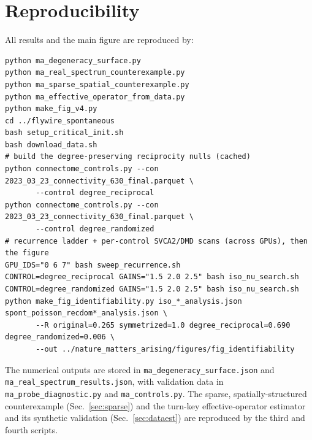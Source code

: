 \documentclass[11pt]{article}
\begin{document}
\section{Reproducibility}
All results and the main figure are reproduced by:
\begin{verbatim}
python ma_degeneracy_surface.py
python ma_real_spectrum_counterexample.py
python ma_sparse_spatial_counterexample.py
python ma_effective_operator_from_data.py
python make_fig_v4.py
cd ../flywire_spontaneous
bash setup_critical_init.sh
bash download_data.sh
# build the degree-preserving reciprocity nulls (cached)
python connectome_controls.py --con 2023_03_23_connectivity_630_final.parquet \
       --control degree_reciprocal
python connectome_controls.py --con 2023_03_23_connectivity_630_final.parquet \
       --control degree_randomized
# recurrence ladder + per-control SVCA2/DMD scans (across GPUs), then the figure
GPU_IDS="0 6 7" bash sweep_recurrence.sh
CONTROL=degree_reciprocal GAINS="1.5 2.0 2.5" bash iso_nu_search.sh
CONTROL=degree_randomized GAINS="1.5 2.0 2.5" bash iso_nu_search.sh
python make_fig_identifiability.py iso_*_analysis.json spont_poisson_recdom*_analysis.json \
       --R original=0.265 symmetrized=1.0 degree_reciprocal=0.690 degree_randomized=0.006 \
       --out ../nature_matters_arising/figures/fig_identifiability
\end{verbatim}
The numerical outputs are stored in \texttt{ma\_degeneracy\_surface.json} and
\texttt{ma\_real\_spectrum\_results.json}, with validation data in
\texttt{ma\_probe\_diagnostic.py} and \texttt{ma\_controls.py}. The sparse,
spatially-structured counterexample (Sec.~\ref{sec:sparse}) and the turn-key
effective-operator estimator and its synthetic validation (Sec.~\ref{sec:dataest})
are reproduced by the third and fourth scripts.
\end{document}
